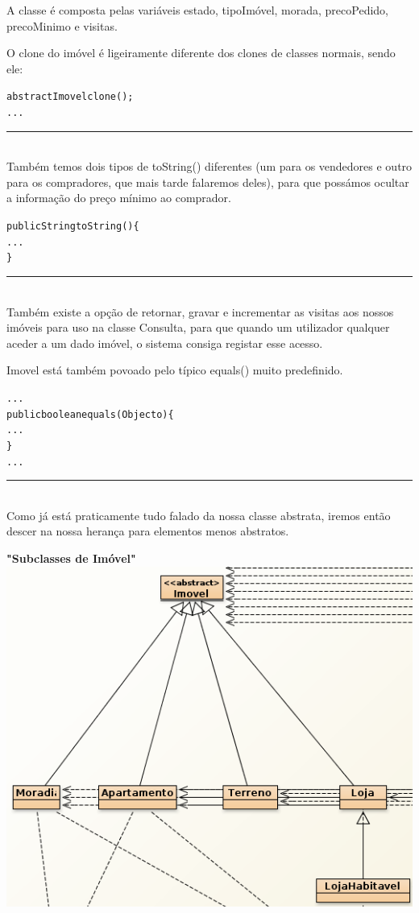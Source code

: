 \documentclass[12pt]{article}
\newenvironment{code}                    
{\textbf{
} \hspace{1cm} \hrulefill \\ 
\smallskip 
\begin{center}
\begin{minipage}{0.9\textwidth} 
\begin{alltt}\small}
{\end{alltt}
\end{minipage}
\end{center}
\hrule\smallskip
}
\begin{document}
A classe é composta pelas variáveis estado, tipoImóvel, morada, precoPedido, precoMinimo e visitas. 
\newline

O clone do imóvel é ligeiramente diferente dos clones de classes normais, sendo ele:
\newline
\begin{code}
 abstract Imovel clone();
...
\end{code}
~\\

Também temos dois tipos de toString() diferentes (um para os vendedores e outro para os compradores, que mais tarde falaremos deles), para que possámos ocultar a informação do preço mínimo ao comprador.
\newline
\begin{code}
public String toString()\{
...
\}
\end{code}
~\\

Também existe a opção de retornar, gravar e incrementar as visitas aos nossos imóveis para uso na classe Consulta, para que quando um utilizador qualquer aceder a um dado imóvel, o sistema consiga registar esse acesso.
\newline

Imovel está também povoado pelo típico equals() muito predefinido.
\newline
\begin{code}
...
public boolean equals(Object o)\{
...
\}
...
\end{code}
~\\

Como já está praticamente tudo falado da nossa classe abstrata, iremos então descer na nossa herança para elementos menos abstratos.
\pagebreak

\textbf{"Subclasses de Imóvel"}
\newline
\newline
\includegraphics[scale=0.5]{003.png}	
\newline
\end{document}
